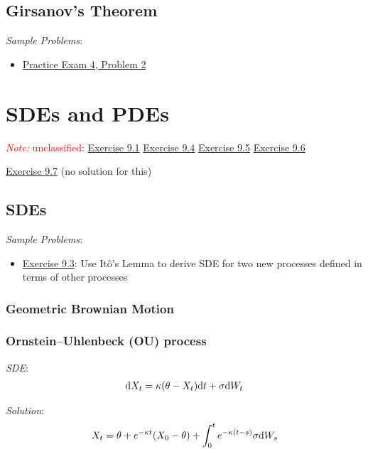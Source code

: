 \documentclass[12pt]{article}
\newcommand{\note}[1]{\textcolor{red}{\textit{Note:} #1}}
\begin{document}
\subsection{Girsanov's Theorem}

\textit{Sample Problems}:
\begin{itemize}[nolistsep]
    \item \hyperref[Practice Exam 4, Problem 2]{Practice Exam 4, Problem 2}
\end{itemize}


\pagebreak
\section{SDEs and PDEs}
\note{unclassified}:
\hyperref[Exercise 9.4]{Exercise 9.1}
\hyperref[Exercise 9.4]{Exercise 9.4}
\hyperref[Exercise 9.5]{Exercise 9.5}
\hyperref[Exercise 9.6]{Exercise 9.6}

\hyperref[Exercise 9.7]{Exercise 9.7} (no solution for this)


\subsection{SDEs}

\textit{Sample Problems}:
\begin{itemize}[nolistsep]
    \item \hyperref[Exercise 9.3]{Exercise 9.3}: Use It\^o's Lemma to derive SDE for two new processes defined in terms of other processes
\end{itemize}


\subsubsection{Geometric Brownian Motion}

\subsubsection{Ornstein--Uhlenbeck (OU) process}
\textit{SDE}:
\begin{align*}
    \mathrm{d} X_t = \kappa(\theta-X_t)\mathrm{d} t + \sigma \mathrm{d} W_t
\end{align*}

\textit{Solution}:
\begin{align*}
    X_t = \theta + e^{-\kappa t}(X_0-\theta) + \int_0^t e^{-\kappa(t-s)}\sigma \mathrm{d} W_s
\end{align*}
\end{document}
